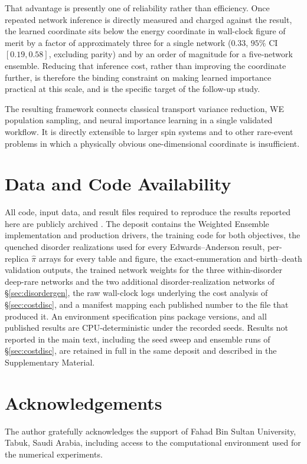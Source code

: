 \documentclass[a4paper,fleqn]{cas-sc}
\begin{document}
That advantage is presently one of reliability rather than efficiency. Once repeated network
inference is directly measured and charged against the result, the learned coordinate sits below
the energy coordinate in wall-clock figure of merit by a factor of approximately three for a
single network ($0.33$, $95\%$ CI $[0.19,0.58]$, excluding parity) and by an order of magnitude
for a five-network ensemble. Reducing that inference cost, rather than improving the coordinate
further, is therefore the binding constraint on making learned importance practical at this
scale, and is the specific target of the follow-up study.

The resulting framework connects classical transport variance reduction, WE population sampling,
and neural importance learning in a single validated workflow. It is directly extensible to larger
spin systems and to other rare-event problems in which a physically obvious one-dimensional
coordinate is insufficient.

\section*{Data and Code Availability}
All code, input data, and result files required to reproduce the results reported here are
publicly archived \citep{dataset}. The deposit contains the Weighted Ensemble implementation and
production drivers, the training code for both objectives, the quenched disorder realizations used
for every Edwards--Anderson result, per-replica $\hat\pi$ arrays for every table and figure, the
exact-enumeration and birth--death validation outputs, the trained network weights for the three
within-disorder deep-rare networks and the two additional disorder-realization networks of
\S\ref{sec:disordergen}, the raw wall-clock logs underlying the cost analysis of
\S\ref{sec:costdisc},
and a manifest mapping each published number to the file that produced it. An environment
specification pins package versions, and all published results are CPU-deterministic under the
recorded seeds. Results not reported in the main text, including the seed sweep and ensemble runs
of \S\ref{sec:costdisc}, are retained in full in the same deposit and described in the
Supplementary Material.

\section*{Acknowledgements}
The author gratefully acknowledges the support of Fahad Bin Sultan University, Tabuk, Saudi Arabia,
including access to the computational environment used for the numerical experiments.
\end{document}

